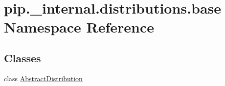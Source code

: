 \hypertarget{namespacepip_1_1__internal_1_1distributions_1_1base}{}\section{pip.\+\_\+internal.\+distributions.\+base Namespace Reference}
\label{namespacepip_1_1__internal_1_1distributions_1_1base}
\subsection*{Classes}
\begin{DoxyCompactItemize}
\item 
class \hyperlink{classpip_1_1__internal_1_1distributions_1_1base_1_1AbstractDistribution}{Abstract\+Distribution}
\end{DoxyCompactItemize}
